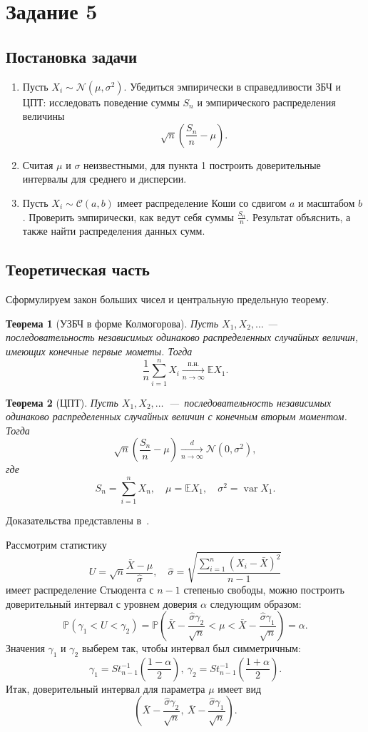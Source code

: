\documentclass[12pt, a4paper]{article} %
\newtheorem{Th}{Теорема}
\def\Expec{\mathbb{E}} %
\def\Norm{\mathcal{N}} %
\DeclareMathOperator{\var}{var}
\begin{document}
\section{Задание 5}
\subsection{Постановка задачи}

\begin{enumerate}
\item Пусть $X_i \sim \mathcal{N}(\mu, \sigma^2)$. Убедиться эмпирически в справедливости ЗБЧ и ЦПТ: исследовать поведение суммы $S_n$ и эмпирического распределения величины
$$\sqrt{n}\left(\frac{S_n}{n} - \mu\right).$$
\item Считая $\mu$ и $\sigma$ неизвестными, для пункта 1 построить доверительные интервалы для среднего и дисперсии.
\item Пусть $X_i \sim \mathcal{C}(a, b)$ имеет распределение Коши со сдвигом $a$ и масштабом $b$. Проверить эмпирически, как ведут себя суммы $\frac{S_n}{n}$. Результат объяснить, а также найти распределения данных сумм.
\end{enumerate}
\subsection{Теоретическая часть}

Сформулируем закон больших чисел и центральную предельную теорему.
\begin{Th}[УЗБЧ в форме Колмогорова]
Пусть $X_1, X_2, \ldots$ --- последовательность независимых одинаково распределенных случайных величин, имеющих конечные первые мометы. Тогда
\[
    \frac{1}{n} \sum\limits_{i=1}^{n} X_i \xrightarrow[n\rightarrow \infty]{\text{п.н.}} \Expec X_1.
\] 
\end{Th}

\begin{Th}[ЦПТ]
    Пусть $X_1, X_2,\ldots $~---~последовательность независимых одинаково распределенных случайных величин с конечным вторым моментом.
    Тогда 
    \[
        \sqrt n \left(\frac{S_n}{n}- \mu\right) \xrightarrow[n \rightarrow \infty]{d} \Norm(0, \sigma^2),
    \] 
    где 
    \[
        S_n = \sum\limits_{i=1}^{n} X_n, \quad 
        \mu = \Expec X_1, \quad \sigma^2 = \var X_1.
    \] 
\end{Th} 
Доказательства представлены в~\cite{Shir}.


Рассмотрим статистику $$U = \sqrt{n}\frac{\bar X - \mu}{\hat \sigma}, \quad \hat \sigma = \sqrt{\dfrac{\sum_{i=1}^n(X_i - \bar X)^2}{n-1}}$$
имеет \cite{DeGroot} распределение Стьюдента с $n - 1$ степенью свободы, можно построить доверительный интервал с уровнем доверия $\alpha$ следующим образом:
$$\mathbb{P}(\gamma_1 < U < \gamma_2) = \mathbb{P}\left(\bar X - \frac{\hat\sigma\gamma_2}{\sqrt{n}} < \mu < \bar X - \frac{\hat\sigma\gamma_1}{\sqrt{n}}\right) = \alpha.$$
Значения $\gamma_1$ и $\gamma_2$ выберем так, чтобы интервал был симметричным:
$$\gamma_1 = St^{-1}_{n-1}\left(\frac{1 - \alpha}{2}\right),\  \gamma_2 = St^{-1}_{n-1}\left(\frac{1 + \alpha}{2}\right).$$
Итак, доверительный интервал для параметра $\mu$ имеет вид
$$\left(\bar X - \frac{\hat\sigma\gamma_2}{\sqrt{n}}, \ \bar X - \frac{\hat\sigma\gamma_1}{\sqrt{n}}\right).$$
\end{document}
